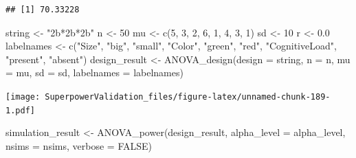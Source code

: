 \documentclass[
]{book}
\newenvironment{Shaded}{\begin{snugshade}}{\end{snugshade}}
\newcommand{\AttributeTok}[1]{\textcolor[rgb]{0.77,0.63,0.00}{#1}}
\newcommand{\ConstantTok}[1]{\textcolor[rgb]{0.00,0.00,0.00}{#1}}
\newcommand{\DecValTok}[1]{\textcolor[rgb]{0.00,0.00,0.81}{#1}}
\newcommand{\FloatTok}[1]{\textcolor[rgb]{0.00,0.00,0.81}{#1}}
\newcommand{\FunctionTok}[1]{\textcolor[rgb]{0.00,0.00,0.00}{#1}}
\newcommand{\NormalTok}[1]{#1}
\newcommand{\OtherTok}[1]{\textcolor[rgb]{0.56,0.35,0.01}{#1}}
\newcommand{\StringTok}[1]{\textcolor[rgb]{0.31,0.60,0.02}{#1}}
\begin{document}
\begin{verbatim}
## [1] 70.33228
\end{verbatim}

\begin{Shaded}
\begin{Highlighting}[]
\NormalTok{string }\OtherTok{\textless{}{-}} \StringTok{"2b*2b*2b"}
\NormalTok{n }\OtherTok{\textless{}{-}} \DecValTok{50}
\NormalTok{mu }\OtherTok{\textless{}{-}} \FunctionTok{c}\NormalTok{(}\DecValTok{5}\NormalTok{, }\DecValTok{3}\NormalTok{, }\DecValTok{2}\NormalTok{, }\DecValTok{6}\NormalTok{, }\DecValTok{1}\NormalTok{, }\DecValTok{4}\NormalTok{, }\DecValTok{3}\NormalTok{, }\DecValTok{1}\NormalTok{) }
\NormalTok{sd }\OtherTok{\textless{}{-}} \DecValTok{10}
\NormalTok{r }\OtherTok{\textless{}{-}} \FloatTok{0.0}
\NormalTok{labelnames }\OtherTok{\textless{}{-}} \FunctionTok{c}\NormalTok{(}\StringTok{"Size"}\NormalTok{, }\StringTok{"big"}\NormalTok{, }\StringTok{"small"}\NormalTok{, }
                \StringTok{"Color"}\NormalTok{, }\StringTok{"green"}\NormalTok{, }\StringTok{"red"}\NormalTok{, }
                \StringTok{"CognitiveLoad"}\NormalTok{, }\StringTok{"present"}\NormalTok{, }\StringTok{"absent"}\NormalTok{) }
\NormalTok{design\_result }\OtherTok{\textless{}{-}} \FunctionTok{ANOVA\_design}\NormalTok{(}\AttributeTok{design =}\NormalTok{ string,}
                   \AttributeTok{n =}\NormalTok{ n, }
                   \AttributeTok{mu =}\NormalTok{ mu, }
                   \AttributeTok{sd =}\NormalTok{ sd, }
                   \AttributeTok{labelnames =}\NormalTok{ labelnames)}
\end{Highlighting}
\end{Shaded}

\texttt{[image: SuperpowerValidation\_files/figure-latex/unnamed-chunk-189-1.pdf]}

\begin{Shaded}
\begin{Highlighting}[]
\NormalTok{simulation\_result }\OtherTok{\textless{}{-}} \FunctionTok{ANOVA\_power}\NormalTok{(design\_result, }
                                 \AttributeTok{alpha\_level =}\NormalTok{ alpha\_level, }
                                 \AttributeTok{nsims =}\NormalTok{ nsims,}
                                 \AttributeTok{verbose =} \ConstantTok{FALSE}\NormalTok{)}
\end{Highlighting}
\end{Shaded}
\end{document}
